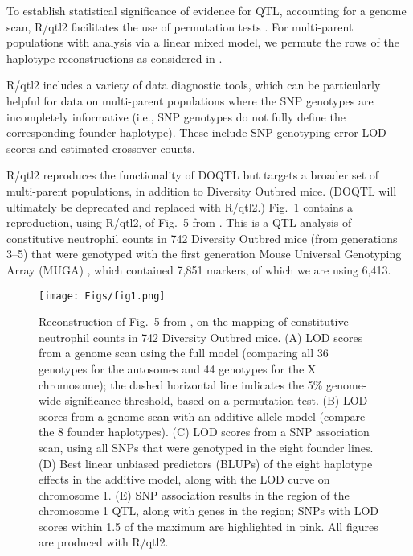 \documentclass[12pt,letterpaper]{article}
\begin{document}
To establish statistical significance of evidence for QTL, accounting
for a genome scan, R/qtl2 facilitates the use of permutation tests
\citep{churchill1994}. For multi-parent populations with analysis via
a linear mixed model, we permute the rows of the haplotype reconstructions as
considered in \citet{cheng2013}.

R/qtl2 includes a variety of data diagnostic tools, which can be
particularly helpful for data on multi-parent populations where
the SNP genotypes are incompletely informative
(i.e., SNP genotypes do not fully define the corresponding founder haplotype).
These include SNP
genotyping error LOD scores \citep{Lincoln1992} and estimated
crossover counts.

R/qtl2 reproduces the functionality of DOQTL \citep{gatti2014} but
targets a broader set of multi-parent populations, in addition to
Diversity Outbred mice.
(DOQTL will ultimately be deprecated and replaced with R/qtl2.)
Fig.~1 contains a reproduction, using
R/qtl2, of Fig.~5 from \citet{gatti2014}. This is a QTL analysis of
constitutive neutrophil counts in 742 Diversity Outbred mice (from
generations 3--5) that were genotyped with the first generation Mouse
Universal Genotyping Array (MUGA) \citep{gigamuga}, which contained
7,851 markers, of which we are using 6,413.

\begin{figure}
  \texttt{[image: Figs/fig1.png]}
  \caption{Reconstruction of Fig.~5 from \citet{gatti2014}, on the
    mapping of constitutive neutrophil counts in 742 Diversity Outbred
    mice. (A) LOD scores from a genome scan using the full model
    (comparing all 36 genotypes for the autosomes and 44 genotypes for
    the X chromosome); the dashed horizontal line indicates the 5\%
    genome-wide significance threshold, based on a permutation test.
    (B) LOD scores from a genome scan with an additive allele model
    (compare the 8 founder haplotypes). (C) LOD scores from a SNP
    association scan, using all SNPs that were genotyped in the eight
    founder lines. (D) Best linear unbiased predictors (BLUPs) of the
    eight haplotype effects in the additive model, along with the LOD
    curve on chromosome 1. (E) SNP association results in the region
    of the chromosome 1 QTL, along with genes in the region; SNPs with
    LOD scores within 1.5 of the maximum are highlighted in pink.
  All figures are produced with R/qtl2.}
\end{figure}
\end{document}
